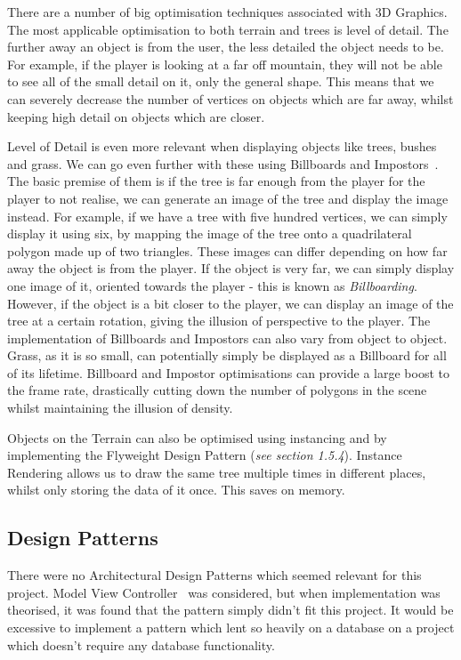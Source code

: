 \documentclass[a4paper,10pt]{report}
\begin{document}
There are a number of big optimisation techniques associated with 3D Graphics. The most applicable optimisation to both terrain and trees is level of detail. The further away an object is from the user, the less detailed the object needs to be. For example, if the player is looking at a far off mountain, they will not be able to see all of the small detail on it, only the general shape. This means that we can severely decrease the number of vertices on objects which are far away, whilst keeping high detail on objects which are closer. \medskip

Level of Detail is even more relevant when displaying objects like trees, bushes and grass. We can go even further with these using Billboards and Impostors~\cite{jia2013fast}. The basic premise of them is if the tree is far enough from the player for the player to not realise, we can generate an image of the tree and display the image instead. For example, if we have a tree with five hundred vertices, we can simply display it using six, by mapping the image of the tree onto a quadrilateral polygon made up of two triangles. These images can differ depending on how far away the object is from the player. If the object is very far, we can simply display one image of it, oriented towards the player - this is known as \textit{Billboarding}. However, if the object is a bit closer to the player, we can display an image of the tree at a certain rotation, giving the illusion of perspective to the player. The implementation of Billboards and Impostors can also vary from object to object. Grass, as it is so small, can potentially simply be displayed as a Billboard for all of its lifetime. Billboard and Impostor optimisations can provide a large boost to the frame rate, drastically cutting down the number of polygons in the scene whilst maintaining the illusion of density. \medskip

Objects on the Terrain can also be optimised using instancing and by implementing the Flyweight Design Pattern (\emph{see section 1.5.4}). Instance Rendering allows us to draw the same tree multiple times in different places, whilst only storing the data of it once. This saves on memory.  

\subsection{Design Patterns}

There were no Architectural Design Patterns which seemed relevant for this project. Model View Controller~\cite{vlissides1995design} was considered, but when implementation was theorised, it was found that the pattern simply didn't fit this project. It would be excessive to implement a pattern which lent so heavily on a database on a project which doesn't require any database functionality. \medskip
\end{document}
